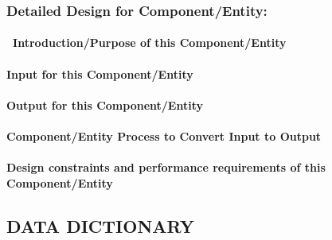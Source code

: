 \documentclass[twoside,letterpaper]{article}
\begin{document}
{\bigskip


\subsubsection{Detailed Design for Component/Entity:
}

\paragraph[\ Introduction/Purpose of this
Component/Entity]{\ Introduction/Purpose of this Component/Entity}
{\color{black}

}

\paragraph[Input for this Component/Entity]{Input for this
Component/Entity}
{\color{black}

}

\paragraph{Output for this Component/Entity}
{\color{black}

}

\paragraph{Component/Entity Process to Convert Input to Output}
{\color{black}

}

\paragraph{Design constraints and performance requirements of this
Component/Entity}
{\color{black}

}

\bigskip




\subsection{DATA DICTIONARY}

}
\end{document}
